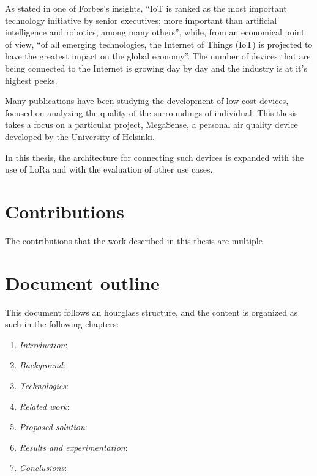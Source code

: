 	As stated in one of Forbes's insights, ``IoT is ranked as the most important technology initiative by senior executives; more important than artificial intelligence and robotics, among many others'', while, from an economical point of view, ``of all emerging technologies, the Internet of Things (IoT) is projected to have the greatest impact on the global economy''\cite{forbes}.
	The number of devices that are being connected to the Internet is growing day by day and the industry is at it's highest peeks.

	Many publications have been studying the development of low-cost devices, focused on analyzing the quality of the surroundings of individual. 
	This thesis takes a focus on a particular project, MegaSense, a personal air quality device developed by the University of Helsinki.
	
	In this thesis, the architecture for connecting such devices is expanded with the use of LoRa and with the evaluation of other use cases.
	
	\section{Contributions}\label{sec:contributions}
	
		The contributions that the work described in this thesis are multiple
		
	
	\section{Document outline}\label{sec:document_outline}
		
		This document follows an hourglass structure, and the content is organized as such in the following chapters:
		
		\begin{enumerate}
			
			\item \hyperref[chapter:introduction]{\textit{Introduction}}:
			\item \textit{Background}:
			\item \textit{Technologies}:
			\item \textit{Related work}:
			\item \textit{Proposed solution}:
			\item \textit{Results and experimentation}:
			\item \textit{Conclusions}:
			
		\end{enumerate}
